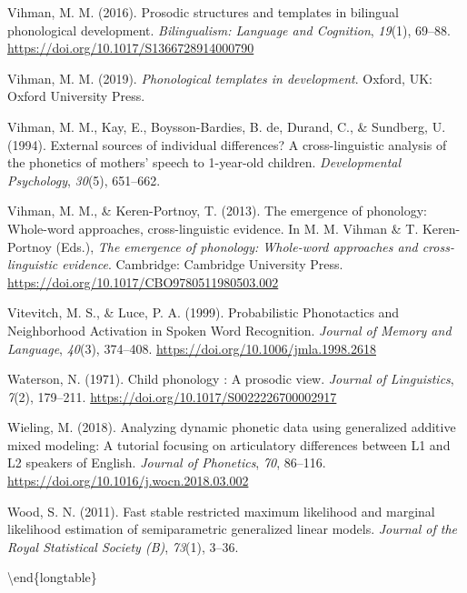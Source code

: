 \documentclass[
  man]{apa6}
\newlength{\cslhangindent}
\newlength{\cslentryspacingunit} %
\newenvironment{CSLReferences}[2] %
 {%
  \setlength{\parindent}{0pt}
  \ifodd #1
  \let\oldpar\par
  \def\par{\hangindent=\cslhangindent\oldpar}
  \fi
  \setlength{\parskip}{#2\cslentryspacingunit}
 }%
 {}
\begin{document}
\begin{CSLReferences}{1}{0}
\leavevmode{}%
Vihman, M. M. (2016). Prosodic structures and templates in bilingual phonological development. \emph{Bilingualism: Language and Cognition}, \emph{19}(1), 69--88. \url{https://doi.org/10.1017/S1366728914000790}

\leavevmode{}%
Vihman, M. M. (2019). \emph{Phonological templates in development}. Oxford, {UK}: Oxford University Press.

\leavevmode{}%
Vihman, M. M., Kay, E., Boysson-Bardies, B. de, Durand, C., \& Sundberg, U. (1994). External sources of individual differences? A cross-linguistic analysis of the phonetics of mothers' speech to 1-year-old children. \emph{Developmental Psychology}, \emph{30}(5), 651--662.

\leavevmode{}%
Vihman, M. M., \& Keren-Portnoy, T. (2013). The emergence of phonology: Whole-word approaches, cross-linguistic evidence. In M. M. Vihman \& T. Keren-Portnoy (Eds.), \emph{The emergence of phonology: Whole-word approaches and cross-linguistic evidence}. Cambridge: Cambridge University Press. \url{https://doi.org/10.1017/CBO9780511980503.002}

\leavevmode{}%
Vitevitch, M. S., \& Luce, P. A. (1999). Probabilistic {Phonotactics} and {Neighborhood} {Activation} in {Spoken} {Word} {Recognition}. \emph{Journal of Memory and Language}, \emph{40}(3), 374--408. \url{https://doi.org/10.1006/jmla.1998.2618}

\leavevmode{}%
Waterson, N. (1971). Child phonology : A prosodic view. \emph{Journal of Linguistics}, \emph{7}(2), 179--211. \url{https://doi.org/10.1017/S0022226700002917}

\leavevmode{}%
Wieling, M. (2018). Analyzing dynamic phonetic data using generalized additive mixed modeling: {A} tutorial focusing on articulatory differences between {L1} and {L2} speakers of {English}. \emph{Journal of Phonetics}, \emph{70}, 86--116. \url{https://doi.org/10.1016/j.wocn.2018.03.002}

\leavevmode{}%
Wood, S. N. (2011). Fast stable restricted maximum likelihood and marginal likelihood estimation of semiparametric generalized linear models. \emph{Journal of the Royal Statistical Society (B)}, \emph{73}(1), 3--36.

\end{CSLReferences}

\textbackslash end\{longtable\}
\endgroup


\clearpage
\renewcommand{\listfigurename}{Figure captions}
\end{document}
